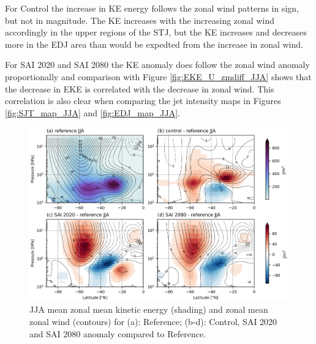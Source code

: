 For Control the increase in KE energy follows the zonal wind patterns in sign, but not in magnitude. The KE increases with the increasing zonal wind accordingly in the upper regions of the STJ, but the KE increases and decreases more in the EDJ area than would be expedted from the increase in zonal wind. 

For SAI 2020 and SAI 2080 the KE anomaly does follow the zonal wind anomaly proportionally and comparison with Figure \ref{fig:EKE_U_zmdiff_JJA} shows that the decrease in EKE is correlated with the decrease in zonal wind. This correlation is also clear when comparing the jet intensity maps in Figures \ref{fig:SJT_map_JJA} and \ref{fig:EDJ_map_JJA}.

\begin{figure}[H]
	\centering
	\includegraphics[width=0.95\linewidth]{images/KE_U_zmdiff_JJA.png}
	\caption{JJA mean zonal mean kinetic energy (shading) and zonal mean zonal wind (contours) for (a): Reference; (b-d): Control, SAI 2020 and SAI 2080 anomaly compared to Reference.}
	\label{fig:KE_U_zmdiff_JJA}
\end{figure}